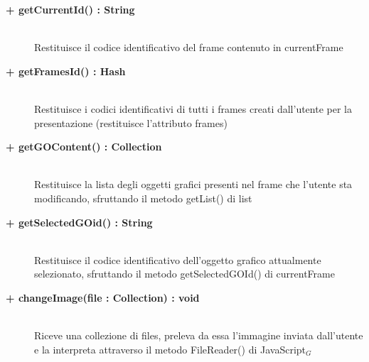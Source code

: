 \begin{description}
\begin{description}
\begin{description}
		\end{description}
	\end{description}
	
	
	\begin{description}
		\item[\textbf{\color{blue}+ getCurrentId() : String	}] \hfill \\
			Restituisce il codice identificativo del frame contenuto in currentFrame
		
	\end{description}
	
	
	\begin{description}
		\item[\textbf{\color{blue}+ getFramesId() : Hash	}] \hfill \\
			Restituisce i codici identificativi di tutti i frames creati dall'utente per la presentazione (restituisce l'attributo frames)
		
	\end{description}
	
	\begin{description}
		\item[\textbf{\color{blue}+ getGOContent() : Collection	}] \hfill \\
			Restituisce la lista degli oggetti grafici presenti nel frame che l'utente sta modificando, sfruttando il metodo getList() di list
		
	\end{description}
	
	\begin{description}
		\item[\textbf{\color{blue}+ getSelectedGOid() : String	}] \hfill \\
			Restituisce il codice identificativo dell'oggetto grafico attualmente selezionato, sfruttando il metodo getSelectedGOId() di currentFrame
		
	\end{description}
	
	\begin{description}
		\item[\textbf{\color{blue}+ changeImage(file : Collection) : void  	}] \hfill \\
			Riceve una collezione di files, preleva da essa l'immagine inviata dall'utente e la interpreta attraverso il metodo FileReader() di JavaScript$_G$
			

\end{description}
\end{description}
